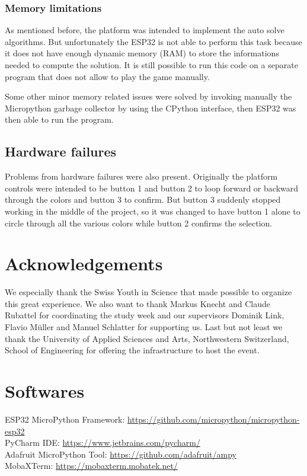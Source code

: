 \documentclass[a4paper, 11pt]{article}
\begin{document}
\subsubsection{Memory limitations}
As mentioned before, the platform was intended to implement the auto solve
algorithms. But unfortunately the ESP32 is not able to perform this task
because it does not have enough dynamic memory (RAM) to store the informations
needed to compute the solution. It is still possible to run this code on a
separate program that does not allow to play the game manually.

Some other minor memory related issues were solved by invoking manually the
Micropython garbage collector by using the CPython interface, then ESP32 was
then able to run the program.

\subsection{Hardware failures}
Problems from hardware failures were also present. Originally the
platform controls were intended to be button 1 and button 2 to loop
forward or backward through the colors and button 3 to confirm. But
button 3 suddenly stopped working in the middle of the project, so it
was changed to have button 1 alone to circle through all the various
colors while button 2 confirms the selection.

\section{Acknowledgements}
We especially thank the Swiss Youth in Science that made possible to
organize this great experience. We also want to thank Markus Knecht and
Claude Rubattel for coordinating the study week and our supervisors
Dominik Link, Flavio Müller and Manuel Schlatter for supporting us. Last
but not least we thank the University of Applied Sciences and Arts,
Northwestern Switzerland, School of Engineering for offering the
infrastructure to host the event.

\section*{Softwares}
ESP32 MicroPython Framework: \url{https://github.com/micropython/micropython-esp32} \\
PyCharm IDE: \url{https://www.jetbrains.com/pycharm/} \\
Adafruit MicroPython Tool: \url{https://github.com/adafruit/ampy} \\
MobaXTerm: \url{https://mobaxterm.mobatek.net/}
\end{document}
